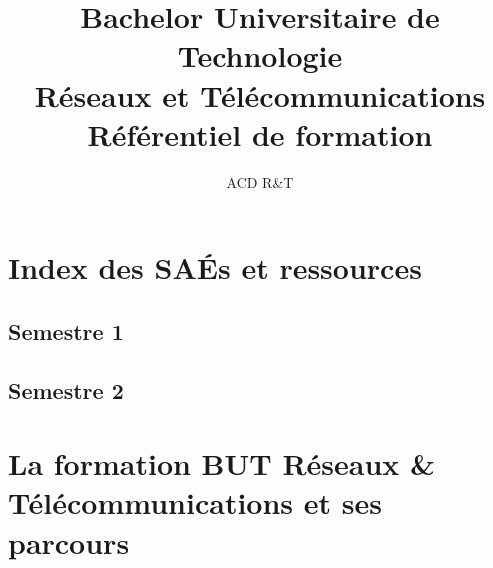 \documentclass[10pt,lualatex,french]{article}
\title{Bachelor Universitaire de Technologie\\
Réseaux et Télécommunications\\
Référentiel de formation}
\author{ACD R\&T}%
\begin{document}
\setmainfont{Arial}
\renewcommand{\labelitemi}{$\bullet$}
\renewcommand{\labelitemii}{$\circ$}
\pagestyle{BO}


\thispagestyle{empty}



\clearpage

\tableofcontents %
	

\clearpage
\section*{Index des SAÉs et ressources}
\subsection*{Semestre 1}
\subsection*{Semestre 2}

\section{La formation BUT R\'eseaux \& T\'el\'ecommunications et ses parcours}



\end{document}
